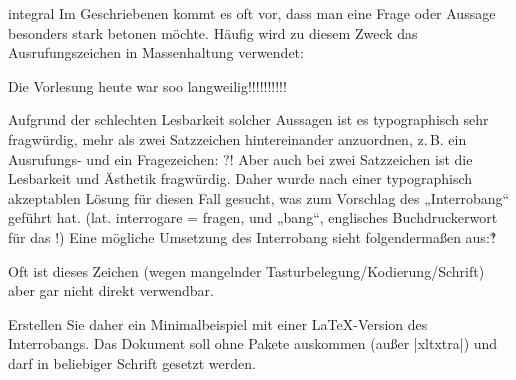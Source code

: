 \documentclass[
	draft,
	blatt=4,
	ausgabe=07.\,05.\,2010,
	rückgabe=14.\,05.\,2010
]{lcourse-hd}
\begin{document}
\begin{exercise}[
  name={Integrale\,/\,Spezialfälle},
  punkte=5,
  abgabe = Quellcode(s) per Mail und ausgedruckt{,} fertige(s) Dokument(e) ausgedruckt]{integral}
\def\dej{\fontspec{DejaVu Sans}}
Im Geschriebenen kommt es oft vor, dass man eine Frage oder Aussage besonders stark betonen möchte. Häufig wird zu diesem Zweck das Ausrufungszeichen in Massenhaltung verwendet:
\begin{lcode}
Die Vorlesung heute war soo langweilig!!!!!!!!!!
\end{lcode}
Aufgrund der schlechten Lesbarkeit solcher Aussagen ist es typographisch sehr fragwürdig, mehr als zwei Satzzeichen hintereinander anzuordnen, z.\,B. ein Ausrufungs- und ein Fragezeichen: ?! Aber auch bei zwei Satzzeichen ist die Lesbarkeit und Ästhetik fragwürdig. Daher wurde nach einer typographisch akzeptablen Lösung für diesen Fall gesucht, was zum Vorschlag des „Interrobang“ geführt hat. (lat. interrogare = fragen, und „bang“, englisches Buchdruckerwort für das !) Eine mögliche Umsetzung des Interrobang sieht folgendermaßen aus:{\dej ‽}

Oft ist dieses Zeichen (wegen mangelnder Tasturbelegung/Kodierung/Schrift) aber gar nicht direkt verwendbar.

Erstellen Sie daher ein Minimalbeispiel mit einer \LaTeX-Version des Interrobangs. Das Dokument soll ohne Pakete auskommen (außer |xltxtra|) und darf in beliebiger Schrift gesetzt werden.
\end{exercise}
\end{document}
